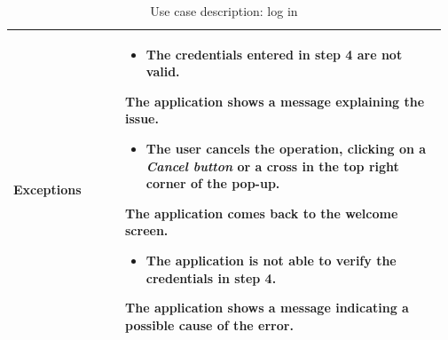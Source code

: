 \begin{table}[H]
\begin{tabular}{@{}p{0.25\linewidth} p{0.72\linewidth}@{}}
		\textbf{Exceptions}         & \begin{itemize}[leftmargin=.4cm,noitemsep,topsep=0pt,before=\vspace{-3mm}]
		   \item The credentials entered in step 4 are not valid.
		\end{itemize}
		The application shows a message explaining the issue.
	    \begin{itemize}[leftmargin=.4cm,noitemsep,topsep=0pt]
		   \item The user cancels the operation, clicking on a \textit{Cancel button} or a cross in the top right corner of the pop-up.
		\end{itemize}
		The application comes back to the welcome screen.
	    \begin{itemize}[leftmargin=.4cm,noitemsep,topsep=0pt]
		   \item The application is not able to verify the credentials in step 4.
		\end{itemize}
		The application shows a message indicating a possible cause of the error.
		\\\bottomrule
	\end{tabular}
	\caption{Use case description: log in} 
\end{table}

